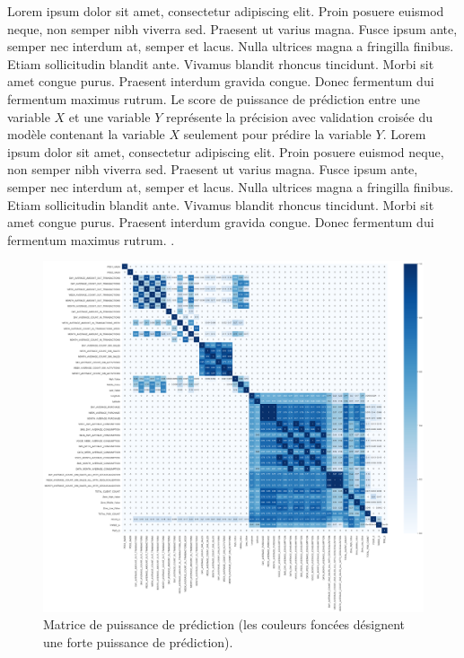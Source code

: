 Lorem ipsum dolor sit amet, consectetur adipiscing elit. Proin posuere euismod neque, non semper nibh viverra sed. Praesent ut varius magna. Fusce ipsum ante, semper nec interdum at, semper et lacus. Nulla ultrices magna a fringilla finibus. Etiam sollicitudin blandit ante. Vivamus blandit rhoncus tincidunt. Morbi sit amet congue purus. Praesent interdum gravida congue. Donec fermentum dui fermentum maximus rutrum. Le score de puissance de prédiction entre une variable $X$ et une variable $Y$ représente la précision avec validation croisée du modèle contenant la variable $X$ seulement pour prédire la variable $Y$. Lorem ipsum dolor sit amet, consectetur adipiscing elit. Proin posuere euismod neque, non semper nibh viverra sed. Praesent ut varius magna. Fusce ipsum ante, semper nec interdum at, semper et lacus. Nulla ultrices magna a fringilla finibus. Etiam sollicitudin blandit ante. Vivamus blandit rhoncus tincidunt. Morbi sit amet congue purus. Praesent interdum gravida congue. Donec fermentum dui fermentum maximus rutrum. \parencite{wetschoreck_rip_2020}.

\begin{figure}[hbt!]
  \centering
  \includegraphics[width=12cm]{images_pfe/features_pps.png}
  \caption{Matrice de puissance de prédiction (les couleurs foncées désignent une forte puissance de prédiction).}
  \label{fig:all-features-pps}
\end{figure}
\FloatBarrier

